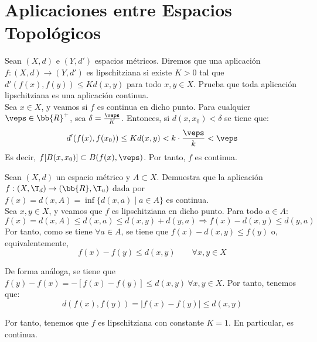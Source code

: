 \section{Aplicaciones entre Espacios Topológicos}\label{sec:Rel2}

\begin{ejercicio}\label{ej:Tema2.1}
    Sean $(X, d)$ e $(Y, d')$ espacios métricos. Diremos que una aplicación $f : (X, d) \to (Y, d')$ es lipschitziana si existe $K > 0$ tal que $d'(f(x), f(y)) \leq Kd(x, y)$ para todo $x, y \in X$. Prueba que toda aplicación lipschitziana es una aplicación continua.\\

    Sea $x\in X$, y veamos si $f$ es continua en dicho punto. Para cualquier $\veps\in \bb{R}^+$, sea $\delta=\frac{\veps}{K}$. Entonces, si $d(x,x_0)<\delta$ se tiene que:
    \begin{equation*}
        d'(f(x), f(x_0)) \leq Kd(x,y) < k\cdot \frac{\veps}{k} < \veps
    \end{equation*}
    Es decir, $f[B(x,x_0)]\subset B(f(x), \veps)$. Por tanto, $f$ es continua.
\end{ejercicio}

\begin{ejercicio}
    Sean $(X, d)$ un espacio métrico y $A \subset X$. Demuestra que la aplicación $f : (X, \T_d) \to (\bb{R},\T_u)$ dada por $f(x) = d(x, A) = \inf\{d(x, a) \mid a \in A\}$ es continua.\\

    Sea $x,y\in X$, y veamos que $f$ es lipschitziana en dicho punto. Para todo $a\in A$:
    \begin{equation*}
        f(x) = d(x,A) \leq d(x,a) \leq d(x,y) + d(y,a) \Longrightarrow f(x) - d(x,y) \leq d(y,a)
    \end{equation*}
    Por tanto, como se tiene $\forall a\in A$, se tiene que $f(x)-d(x,y)\leq f(y)$ o, equivalentemente,
    \begin{equation*}
        f(x)-f(y) \leq d(x,y) \qquad \forall x,y\in X
    \end{equation*}
    
    De forma análoga, se tiene que $f(y)-f(x) = -[f(x)-f(y)] \leq d(x,y) ~ \forall x,y\in X$. Por tanto, tenemos que:
    \begin{equation*}
        d(f(x),f(y)) = |f(x)-f(y)| \leq d(x,y)
    \end{equation*}
    
    Por tanto, tenemos que $f$ es lipschitziana con constante $K=1$. En particular, es continua.
\end{ejercicio}

